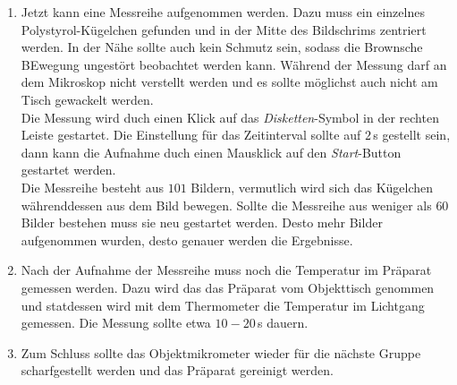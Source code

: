 \begin{enumerate}
  \item Jetzt kann eine Messreihe aufgenommen werden. Dazu muss ein einzelnes Polystyrol-Kügelchen gefunden und in der Mitte des Bildschrims zentriert werden. In der Nähe sollte auch kein Schmutz sein, sodass die Brownsche BEwegung ungestört beobachtet werden kann. Während der Messung darf an dem Mikroskop nicht verstellt werden und es sollte möglichst auch nicht am Tisch gewackelt werden.\\
  Die Messung wird duch einen Klick auf das \emph{Disketten}-Symbol in der rechten Leiste gestartet. Die Einstellung für das Zeitinterval sollte auf $2 \,$s gestellt sein, dann kann die Aufnahme duch einen Mausklick auf den \emph{Start}-Button gestartet werden.\\
  Die Messreihe besteht aus $101$ Bildern, vermutlich wird sich das Kügelchen währenddessen aus dem Bild bewegen. Sollte die Messreihe aus weniger als $60$ Bilder bestehen muss sie neu gestartet werden. Desto mehr Bilder aufgenommen wurden, desto genauer werden die Ergebnisse.

  \item Nach der Aufnahme der Messreihe muss noch die Temperatur im Präparat gemessen werden. Dazu wird das das Präparat vom Objekttisch genommen und statdessen wird mit dem Thermometer die Temperatur im Lichtgang gemessen. Die Messung sollte etwa $10 - 20\,$s dauern.

  \item Zum Schluss sollte das Objektmikrometer wieder für die nächste Gruppe scharfgestellt werden und das Präparat gereinigt werden.


\end{enumerate}
